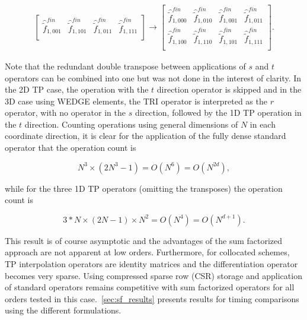 \documentclass[12pt,Bold,letterpaper,TexShade]{mcgilletdclass}
\numberwithin{equation}{section}
\begin{document}
\begin{enumerate}
\begin{equation}
\begin{split}
\begin{bmatrix}
\hat{\tilde{f}}^{fin}_{1,001} & \hat{\tilde{f}}^{fin}_{1,101} & \hat{\tilde{f}}^{fin}_{1,011} & \hat{\tilde{f}}^{fin}_{1,111} \\
\end{bmatrix}
\rightarrow
\begin{bmatrix}
\hat{\tilde{f}}^{fin}_{1,000} & \hat{\tilde{f}}^{fin}_{1,010} & \hat{\tilde{f}}^{fin}_{1,001} & \hat{\tilde{f}}^{fin}_{1,011} \\
\hat{\tilde{f}}^{fin}_{1,100} & \hat{\tilde{f}}^{fin}_{1,110} & \hat{\tilde{f}}^{fin}_{1,101} & \hat{\tilde{f}}^{fin}_{1,111} \\
\end{bmatrix}.
\end{split}
\end{equation}
\end{enumerate}

Note that the redundant double transpose between applications of $s$ and $t$ operators can be combined into one but was not done in the interest of clarity. In the 2D TP case, the operation with the $t$ direction operator is skipped and in the 3D case using WEDGE elements, the TRI operator is interpreted as the $r$ operator, with no operator in the $s$ direction, followed by the 1D TP operation in the $t$ direction. Counting operations using general dimensions of $N$ in each coordinate direction, it is clear for the application of the fully dense standard operator that the operation count is

\begin{equation}
N^3 \times (2N^3-1) = O(N^6) = O(N^{2d}),
\end{equation}

while for the three 1D TP operators (omitting the transposes) the operation count is

\begin{equation}
3*N \times (2N-1) \times N^2 = O(N^4) = O(N^{d+1}).
\end{equation}

This result is of course asymptotic and the advantages of the sum factorized approach are not apparent at low orders. Furthermore, for collocated schemes, TP interpolation operators are identity matrices and the differentiation operator becomes very sparse. Using compressed sparse row (CSR) storage and application of standard operators remains competitive with sum factorized operators for all orders tested in this case.~\autoref{sec:sf_results} presents results for timing comparisons using the different formulations.
\end{document}
